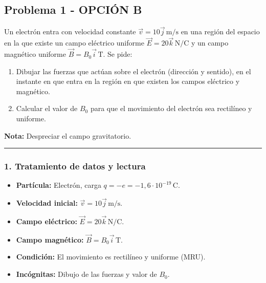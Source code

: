 \newpage

\subsection{Problema 1 - OPCIÓN B}
\label{subsec:4B_2000_jun_ord}

\begin{cajaenunciado}
Un electrón entra con velocidad constante $\vec{v}=10\vec{j}\,\text{m/s}$ en una región del espacio en la que existe un campo eléctrico uniforme $\vec{E}=20\vec{k}\,\text{N/C}$ y un campo magnético uniforme $\vec{B}=B_{0}\vec{i}\,\text{T}$. Se pide:
\begin{enumerate}
    \item Dibujar las fuerzas que actúan sobre el electrón (dirección y sentido), en el instante en que entra en la región en que existen los campos eléctrico y magnético.
    \item Calcular el valor de $B_0$ para que el movimiento del electrón sea rectilíneo y uniforme.
\end{enumerate}
\textbf{Nota:} Despreciar el campo gravitatorio.
\end{cajaenunciado}
\hrule

\subsubsection*{1. Tratamiento de datos y lectura}
\begin{itemize}
    \item \textbf{Partícula:} Electrón, carga $q = -e = -1,6 \cdot 10^{-19} \, \text{C}$.
    \item \textbf{Velocidad inicial:} $\vec{v} = 10 \vec{j} \, \text{m/s}$.
    \item \textbf{Campo eléctrico:} $\vec{E} = 20 \vec{k} \, \text{N/C}$.
    \item \textbf{Campo magnético:} $\vec{B} = B_0 \vec{i} \, \text{T}$.
    \item \textbf{Condición:} El movimiento es rectilíneo y uniforme (MRU).
    \item \textbf{Incógnitas:} Dibujo de las fuerzas y valor de $B_0$.
\end{itemize}

